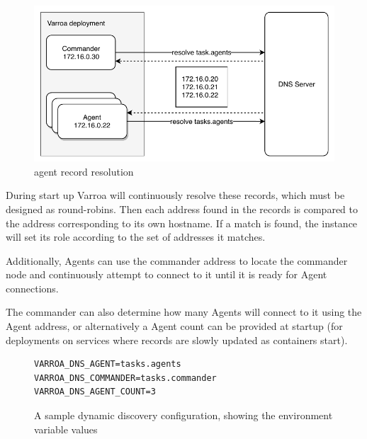 \begin{figure}[h]
\begin{center}
\includegraphics[scale=0.8]{Resources/PDF/ExecutionDnsDiscovery}
\caption{agent record resolution}
\end{center}
\end{figure}

During start up Varroa will continuously resolve these records, which must be designed as round-robins.
Then each address found in the records is compared to the address corresponding to its own hostname. 
If a match is found, the instance will set its role according to the set of addresses it matches.

Additionally, Agents can use the commander address to locate the commander node and continuously attempt to connect to it until it is ready for Agent connections.

The commander can also determine how many Agents will connect to it using the Agent address, or alternatively a Agent count can be  provided at startup (for deployments on services where records are slowly updated as containers start).

\begin{figure}
\begin{lstlisting}
VARROA_DNS_AGENT=tasks.agents
VARROA_DNS_COMMANDER=tasks.commander
VARROA_DNS_AGENT_COUNT=3
\end{lstlisting}
\caption{A sample dynamic discovery configuration, showing the environment variable values}
\end{figure}
